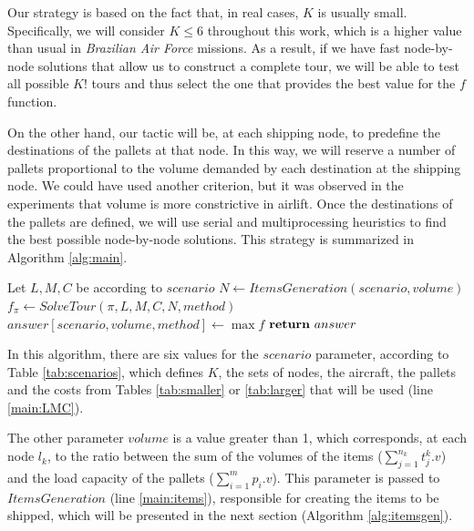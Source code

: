 \documentclass[preprint,authoryear]{elsarticle}
\begin{document}
Our strategy is based on the fact that, in real cases, $K$\/ is usually small. Specifically, we will consider $K \leq 6$\/ throughout this work, which is a higher value than usual in {\it Brazilian Air Force} missions. As a result, if we have fast node-by-node solutions that allow us to construct a complete tour, we will be able to test all possible $K!$\/ tours and thus select the one that provides the best value for the $f$\/ function.

On the other hand, our tactic will be, at each shipping node, to predefine the destinations of the pallets at that node. In this way, we will reserve a number of pallets proportional to the volume demanded by each destination at the shipping node. We could have used another criterion, but it was observed in the experiments that volume is more constrictive in airlift. Once the destinations of the pallets are defined, we will use serial and multiprocessing heuristics to find the best possible node-by-node solutions. This strategy is summarized in Algorithm \ref{alg:main}.


\begin{algorithm}[H]
	\caption{$ACLP+RPDP (scenario,volume)$}  \label{alg:main}
	\begin{algorithmic}[1]
		\State Let $L, M, C$ be according to $scenario$ \label{main:LMC}
		\State $N \gets ItemsGeneration(scenario,volume)$ \label{main:items}
			 \label{main:loop1}
				\State $f_{\pi} \gets SolveTour(\pi, L, M, C, N, method )$ \label{main:method}
			\EndFor \label{main:loop2}
			\State $answer[scenario,volume,method] \gets \max f$ \label{main:f}
		\EndFor
		\State $ {\bf return}\ answer$
	\end{algorithmic}
\end{algorithm}


In this algorithm, there are six values for the $scenario$\/ parameter, according to Table \ref{tab:scenarios}, which defines $K$, the sets of nodes, the aircraft, the pallets and the costs from Tables \ref{tab:smaller} or \ref{tab:larger} that will be used (line \ref{main:LMC}).


The other parameter $volume$\/ is a value greater than 1, which corresponds, at each node $l_k$, to the ratio between the sum of the volumes of the items ($\sum_{j=1}^{n_k} t^k_j.v$) and the load capacity of the pallets ($\sum_{i=1}^{m} p_i.v$). This parameter is passed to $ItemsGeneration$\/ (line \ref{main:items}), responsible for creating the items to be shipped, which will be presented in the next section (Algorithm \ref{alg:itemsgen}).
\end{document}

